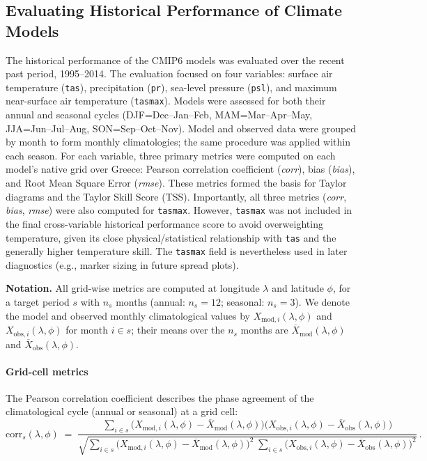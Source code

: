 \documentclass[pdflatex,sn-chicago]{sn-jnl}%
\theoremstyle{thmstyleone}%
\theoremstyle{thmstyletwo}%
\theoremstyle{thmstylethree}%
\begin{document}
\subsection{Evaluating Historical Performance of Climate Models}
The historical performance of the CMIP6 models was evaluated over the recent past period, 1995--2014. The evaluation focused on four variables: surface air temperature (\texttt{tas}), precipitation (\texttt{pr}), sea-level pressure (\texttt{psl}), and maximum near-surface air temperature (\texttt{tasmax}). Models were assessed for both their annual and seasonal cycles (DJF=Dec--Jan--Feb, MAM=Mar--Apr--May, JJA=Jun--Jul--Aug, SON=Sep--Oct--Nov). Model and observed data were grouped by month to form monthly climatologies; the same procedure was applied within each season. For each variable, three primary metrics were computed on each model’s native grid over Greece: Pearson correlation coefficient (\textit{corr}), bias (\textit{bias}), and Root Mean Square Error (\textit{rmse}). These metrics formed the basis for Taylor diagrams and the Taylor Skill Score (TSS). Importantly, all three metrics (\textit{corr}, \textit{bias}, \textit{rmse}) were also computed for \texttt{tasmax}. However, \texttt{tasmax} was not included in the final cross-variable historical performance score to avoid overweighting temperature, given its close physical/statistical relationship with \texttt{tas} and the generally higher temperature skill. The \texttt{tasmax} field is nevertheless used in later diagnostics (e.g., marker sizing in future spread plots).

\medskip
\noindent\textbf{Notation.} All grid-wise metrics are computed at longitude \(\lambda\) and latitude \(\phi\), for a target period \(s\) with \(n_s\) months (annual: \(n_s=12\); seasonal: \(n_s=3\)). We denote the model and observed monthly climatological values by \(X_{\text{mod},i}(\lambda,\phi)\) and \(X_{\text{obs},i}(\lambda,\phi)\) for month \(i\in s\); their means over the \(n_s\) months are \(\overline{X}_{\text{mod}}(\lambda,\phi)\) and \(\overline{X}_{\text{obs}}(\lambda,\phi)\).

\paragraph{\textbf{Grid-cell metrics}}
The Pearson correlation coefficient describes the phase agreement of the climatological cycle (annual or seasonal) at a grid cell:
\begin{equation}
\label{eq:pearson}
\text{corr}_s(\lambda,\phi) \;=\;
\frac{\sum\limits_{i\in s} \bigl(X_{\text{mod},i}(\lambda,\phi) - \overline{X}_{\text{mod}}(\lambda,\phi)\bigr)\bigl(X_{\text{obs},i}(\lambda,\phi) - \overline{X}_{\text{obs}}(\lambda,\phi)\bigr)}
{\sqrt{\sum\limits_{i\in s} \bigl(X_{\text{mod},i}(\lambda,\phi) - \overline{X}_{\text{mod}}(\lambda,\phi)\bigr)^2 \;
       \sum\limits_{i\in s} \bigl(X_{\text{obs},i}(\lambda,\phi) - \overline{X}_{\text{obs}}(\lambda,\phi)\bigr)^2}} \, .
\end{equation}
\end{document}
